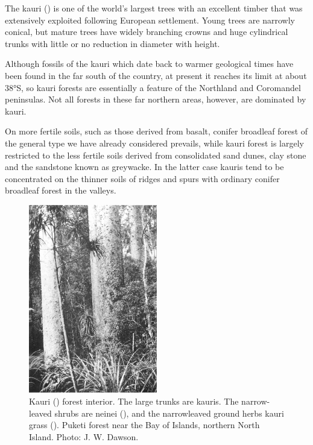 The kauri () is one of the world's largest trees with an excellent timber that was extensively exploited following European settlement.
Young trees are narrowly conical, but mature trees have widely branching crowns and huge cylindrical trunks with little or no reduction in diameter with height.

Although fossils of the kauri which date back to warmer geological times have been found in the far south of the country, at present it reaches its limit at about 38°S, so kauri forests are essentially a feature of the Northland and Coromandel peninsulas.
Not all forests in these far northern areas, however, are dominated by kauri.

On more fertile soils, such as those derived from basalt, conifer broadleaf forest of the general type we have already considered prevails, while kauri forest is largely restricted to the less fertile soils derived from consolidated sand dunes, clay stone and the sandstone known as greywacke.
In the latter case kauris tend to be concentrated on the thinner soils of ridges and spurs with ordinary conifer broadleaf forest in the valleys.

\begin{figure}
	\includegraphics[width=0.5\textwidth]{graphics/figure65kauri.jpg}
	\centering
	\caption[Kauri forest interior]{Kauri () forest interior.
	The large trunks are kauris.
	The narrow-leaved shrubs are neinei (), and the narrowleaved ground herbs kauri grass ().
	Puketi forest near the Bay of Islands, northern North Island.
	Photo:  J. W. Dawson.}%
	\label{fig:65kauri}
\end{figure}

